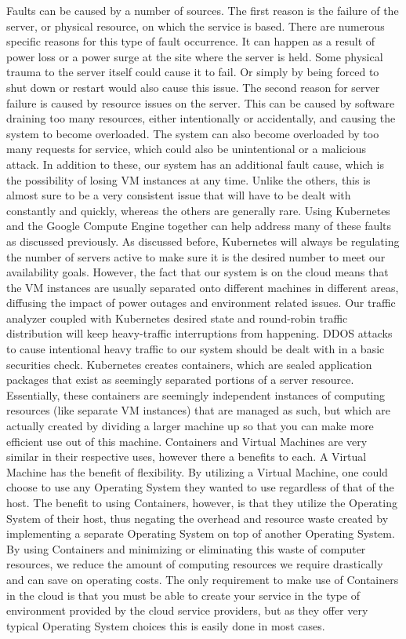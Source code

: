 \documentclass[thesis,proposal]{umassthesis}  %
\begin{document}
	Faults can be caused by a number of sources. The first reason is the failure of the server, or physical resource, on which the service is based. There are numerous specific reasons for this type of fault occurrence. It can happen as a result of power loss or a power surge at the site where the server is held. Some physical trauma to the server itself could cause it to fail. Or simply by being forced to shut down or restart would also cause this issue. The second reason for server failure is caused by resource issues on the server. This can be caused by software draining too many resources, either intentionally or accidentally, and causing the system to become overloaded. The system can also become overloaded by too many requests for service, which could also be unintentional or a malicious attack. In addition to these, our system has an additional fault cause, which is the possibility of losing VM instances at any time. Unlike the others, this is almost sure to be a very consistent issue that will have to be dealt with constantly and quickly, whereas the others are generally rare.
	Using Kubernetes and the Google Compute Engine together can help address many of these faults as discussed previously. As discussed before, Kubernetes will always be regulating the number of servers active to make sure it is the desired number to meet our availability goals. However, the fact that our system is on the cloud means that the VM instances are usually separated onto different machines in different areas, diffusing the impact of power outages and environment related issues. Our traffic analyzer coupled with Kubernetes desired state and round-robin traffic distribution will keep heavy-traffic interruptions from happening. DDOS attacks to cause intentional heavy traffic to our system should be dealt with in a basic securities check.  
Kubernetes creates containers, which are sealed application packages that exist as seemingly separated portions of a server resource. Essentially, these containers are seemingly independent instances of computing resources (like separate VM instances) that are managed as such, but which are actually created by dividing a larger machine up so that you can make more efficient use out of this machine. Containers and Virtual Machines are very similar in their respective uses, however there a benefits to each. A Virtual Machine has the benefit of flexibility. By utilizing a Virtual Machine, one could choose to use any Operating System they wanted to use regardless of that of the host. The benefit to using Containers, however, is that they utilize the Operating System of their host, thus negating the overhead and resource waste created by implementing a separate Operating System on top of another Operating System. By using Containers and minimizing or eliminating this waste of computer resources, we reduce the amount of computing resources we require drastically and can save on operating costs. The only requirement to make use of Containers in the cloud is that you must be able to create your service in the type of environment provided by the cloud service providers, but as they offer very typical Operating System choices this is easily done in most cases.
\end{document}
